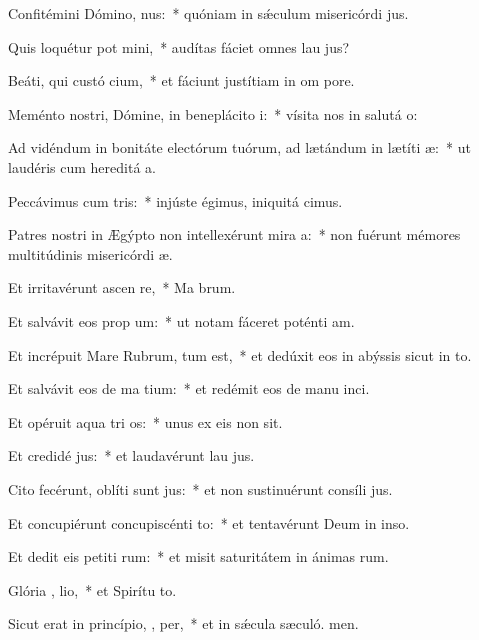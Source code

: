 \item Confitémini Dómino,  nus:~* quóniam in sǽculum misericórdi jus.
\item Quis loquétur pot mini,~* audítas fáciet omnes lau jus?
\item Beáti, qui custó cium,~* et fáciunt justítiam in om pore.
\item Meménto nostri, Dómine, in beneplácito  i:~* vísita nos in salutá o:
\item Ad vidéndum in bonitáte electórum tuórum, ad lætándum in lætíti  æ:~* ut laudéris cum hereditá a.
\item Peccávimus cum  tris:~* injúste égimus, iniquitá cimus.
\item Patres nostri in Ægýpto non intellexérunt mira a:~* non fuérunt mémores multitúdinis misericórdi æ.
\item Et irritavérunt ascen  re,~* Ma brum.
\item Et salvávit eos prop  um:~* ut notam fáceret poténti am.
\item Et incrépuit Mare Rubrum,  tum est,~* et dedúxit eos in abýssis sicut in to.
\item Et salvávit eos de ma tium:~* et redémit eos de manu inci.
\item Et opéruit aqua tri os:~* unus ex eis non sit.
\item Et credidé  jus:~* et laudavérunt lau jus.
\item Cito fecérunt, oblíti sunt  jus:~* et non sustinuérunt consíli jus.
\item Et concupiérunt concupiscénti  to:~* et tentavérunt Deum in inso.
\item Et dedit eis petiti rum:~* et misit saturitátem in ánimas rum.
\item Glória ,  lio,~* et Spirítu to.
\item Sicut erat in princípio,  ,  per,~* et in sǽcula sæculó. men.
